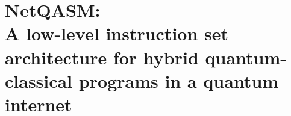 \chapter
 [NetQASM: A low-level instruction set architecture for hybrid quantum-classical programs in a quantum internet]
 {NetQASM:\\A low-level instruction set architecture for hybrid quantum-classical programs in a quantum internet}
\label{chp:netqasm}

\begin{abstract}
    \lipsum[30]
\end{abstract}


\newpage

\lipsum[20-30]

\begin{xstretch}
\printbibliography[heading=subbibintoc,title={References},notcategory=noprint]
\end{xstretch}
